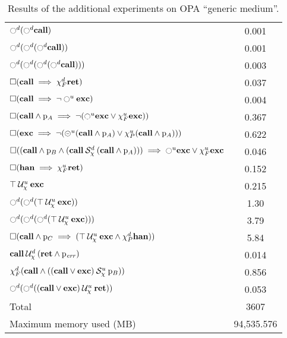 \documentclass{article}
\begin{document}
\begin{table}
\begin{tabular}{| l | c |}
$\ocircle^d (\ocircle^d \mathbf{call})$ & 0.001 \\
$\ocircle^d (\ocircle^d (\ocircle^d \mathbf{call}))$ & 0.001 \\
$\ocircle^d (\ocircle^d (\ocircle^d (\ocircle^d \mathbf{call})))$ & 0.003 \\
$\square (\mathbf{call} \implies \chi_F^{d} \mathbf{ret})$ & 0.037 \\
$\square (\mathbf{call} \implies \neg \ocircle^u \mathbf{exc})$ & 0.004 \\
$\square (\mathbf{call} \land \mathrm{p}_A \implies \neg (\ocircle^u \mathbf{exc} \lor \chi_F^{u} \mathbf{exc}))$ & 0.367 \\
$\square (\mathbf{exc} \implies \neg (\circleddash^u (\mathbf{call} \land \mathrm{p}_A) \lor \chi_P^{u} (\mathbf{call} \land \mathrm{p}_A)))$ & 0.622 \\
$\square ((\mathbf{call} \land \mathrm{p}_B \land ({\mathbf{call}} \mathbin{\mathcal{S}_\chi^d} {(\mathbf{call} \land \mathrm{p}_A)})) \implies \ocircle^u \mathbf{exc} \lor \chi_F^{u} \mathbf{exc}$ & 0.046 \\
$\square (\mathbf{han} \implies \chi_F^{u} \mathbf{ret})$ & 0.152 \\
${\top} \mathbin{\mathcal{U}_\chi^u} {\mathbf{exc}}$ & 0.215 \\
$\ocircle^d (\ocircle^d ({\top} \mathbin{\mathcal{U}_\chi^u} {\mathbf{exc}}))$ & 1.30 \\
$\ocircle^d (\ocircle^d (\ocircle^d ({\top} \mathbin{\mathcal{U}_\chi^u} {\mathbf{exc}})))$ & 3.79 \\
$\square (\mathbf{call} \land \mathrm{p}_C \implies ({\top} \mathbin{\mathcal{U}_\chi^u} {\mathbf{exc} \land \chi_P^{d} \mathbf{han}}))$ & 5.84 \\
${\mathbf{call}} \mathbin{\mathcal{U}_\chi^d} {(\mathbf{ret} \land \mathrm{p}_\mathit{err})}$ & 0.014 \\
$\chi_F^{d} (\mathbf{call} \land ({(\mathbf{call} \lor \mathbf{exc})} \mathbin{\mathcal{S}_\chi^u} {\mathrm{p}_B}))$ & 0.856 \\
$\ocircle^d (\ocircle^d ({(\mathbf{call} \lor \mathbf{exc})} \mathbin{\mathcal{U}_\chi^u} {\mathbf{ret}}))$ & 0.053 \\
\hline
Total & 3607 \\
\hline
\hline
Maximum memory used (MB) & 94,535.576 \\
\hline
\end{tabular}
\caption{Results of the additional experiments on OPA ``generic medium''.}
\label{tab:more-exp-2}
\end{table}
\end{document}
